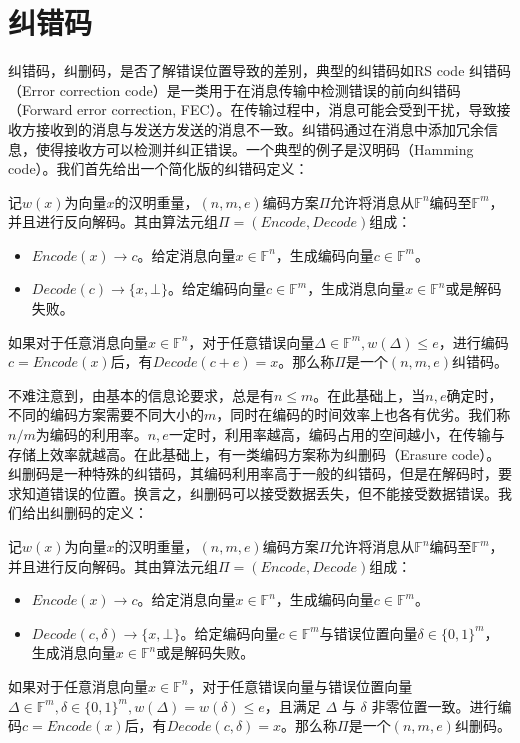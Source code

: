 \section{纠错码}
{纠错码，纠删码，是否了解错误位置导致的差别，典型的纠错码如RS code}
纠错码（Error correction code）是一类用于在消息传输中检测错误的前向纠错码（Forward error correction, FEC）。在传输过程中，消息可能会受到干扰，导致接收方接收到的消息与发送方发送的消息不一致。纠错码通过在消息中添加冗余信息，使得接收方可以检测并纠正错误。一个典型的例子是汉明码（Hamming code）。我们首先给出一个简化版的纠错码定义：

\begin{definition}[纠错码]
    记$w(x)$为向量$x$的汉明重量，$(n,m,e)$编码方案$\Pi$允许将消息从$\mathbb{F}^n$编码至$\mathbb{F}^m$，并且进行反向解码。其由算法元组$\Pi = (Encode, Decode)$组成：
    \begin{itemize}
        \item $Encode(x) \rightarrow c$。给定消息向量$x\in \mathbb{F}^n$，生成编码向量$c\in \mathbb{F}^m$。
        \item $Decode(c) \rightarrow \{x,\bot\}$。给定编码向量$c\in \mathbb{F}^m$，生成消息向量$x\in \mathbb{F}^n$或是解码失败。 
    \end{itemize}
    如果对于任意消息向量$x\in \mathbb{F}^n$，对于任意错误向量$\Delta\in \mathbb{F}^m, w(\Delta)\le e$，进行编码$c = Encode(x)$后，有$Decode(c+e) = x$。那么称$\Pi$是一个$(n,m,e)$纠错码。
\end{definition}

不难注意到，由基本的信息论要求，总是有$n\le m$。在此基础上，当$n,e$确定时，不同的编码方案需要不同大小的$m$，同时在编码的时间效率上也各有优劣。我们称$n/m$为编码的利用率。$n,e$一定时，利用率越高，编码占用的空间越小，在传输与存储上效率就越高。在此基础上，有一类编码方案称为纠删码（Erasure code）。纠删码是一种特殊的纠错码，其编码利用率高于一般的纠错码，但是在解码时，要求知道错误的位置。换言之，纠删码可以接受数据丢失，但不能接受数据错误。我们给出纠删码的定义：

\begin{definition}[纠删码]
    记$w(x)$为向量$x$的汉明重量，$(n,m,e)$编码方案$\Pi$允许将消息从$\mathbb{F}^n$编码至$\mathbb{F}^m$，并且进行反向解码。其由算法元组$\Pi = (Encode, Decode)$组成：
    \begin{itemize}
        \item $Encode(x) \rightarrow c$。给定消息向量$x\in \mathbb{F}^n$，生成编码向量$c\in \mathbb{F}^m$。
        \item $Decode(c, \delta) \rightarrow \{x,\bot\}$。给定编码向量$c\in \mathbb{F}^m$与错误位置向量$\delta\in \{0,1\}^m$，生成消息向量$x\in \mathbb{F}^n$或是解码失败。
    \end{itemize}
    如果对于任意消息向量$x\in \mathbb{F}^n$，对于任意错误向量与错误位置向量$\Delta\in \mathbb{F}^m, \delta\in \{0,1\}^m, w(\Delta)=w(\delta)\le e$，且满足 $\Delta$ 与 $\delta$ 非零位置一致。进行编码$c = Encode(x)$后，有$Decode(c, \delta) = x$。那么称$\Pi$是一个$(n,m,e)$纠删码。
\end{definition}

